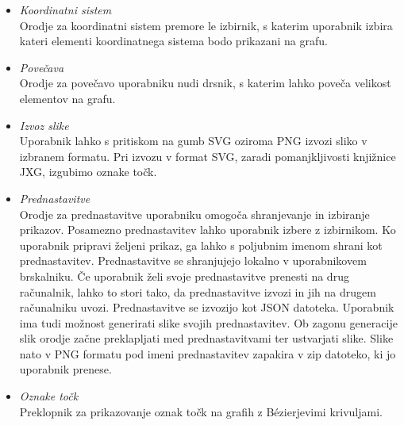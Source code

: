\documentclass[isrm2, tisk]{fmfdelo}
\begin{document}
    \begin{itemize}
        \item {\it Koordinatni sistem}\\
        Orodje za koordinatni sistem premore le izbirnik, s katerim uporabnik izbira kateri elementi koordinatnega sistema bodo prikazani na grafu.
        \item {\it Povečava}\\
        Orodje za povečavo uporabniku nudi drsnik, s katerim lahko poveča velikost elementov na grafu.
        \item {\it Izvoz slike} \\
        Uporabnik lahko s pritiskom na gumb SVG oziroma PNG izvozi sliko v izbranem formatu.
        Pri izvozu v format SVG, zaradi pomanjkljivosti knjižnice JXG, izgubimo oznake točk.
        \item {\it Prednastavitve} \\
        Orodje za prednastavitve uporabniku omogoča shranjevanje in izbiranje prikazov.
        Posamezno prednastavitev lahko uporabnik izbere z izbirnikom.
        Ko uporabnik pripravi željeni prikaz, ga lahko s poljubnim imenom shrani kot prednastavitev.
        Prednastavitve se shranjujejo lokalno v uporabnikovem brskalniku.
        Če uporabnik želi svoje prednastavitve prenesti na drug računalnik, lahko to stori tako, da prednastavitve izvozi in jih na drugem računalniku uvozi.
        Prednastavitve se izvozijo kot JSON datoteka.
        Uporabnik ima tudi možnost generirati slike svojih prednastavitev.
        Ob zagonu generacije slik orodje začne preklapljati med prednastavitvami ter ustvarjati slike.
        Slike nato v PNG formatu pod imeni prednastavitev zapakira v zip datoteko, ki jo uporabnik prenese.
        \item {\it Oznake točk}\\
        Preklopnik za prikazovanje oznak točk na grafih z Bézierjevimi krivuljami.
    \end{itemize}
\end{document}
